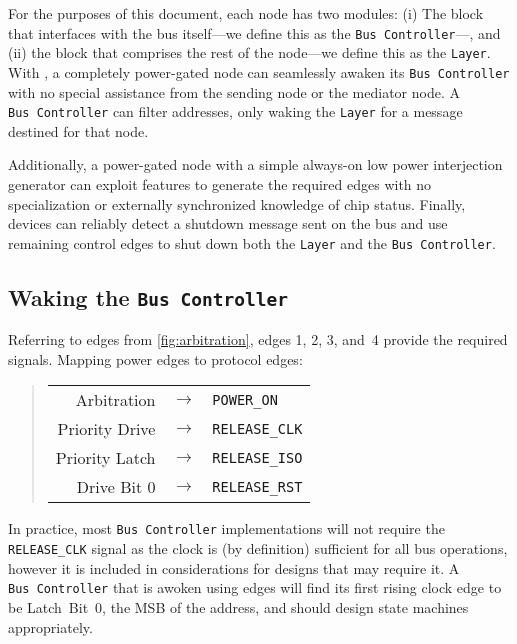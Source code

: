 For the purposes of this document, each \bus node has two modules: (i) The
block that interfaces with the bus itself---we define this as the {\tt Bus
Controller}---, and (ii) the block that comprises the rest of the node---we
define this as the {\tt Layer}. With \bus, a completely power-gated node can
seamlessly awaken its {\tt Bus~Controller} with no special assistance from the
sending node or the mediator node. A {\tt Bus~Controller} can filter addresses,
only waking the {\tt Layer} for a message destined for that node.

Additionally, a power-gated node with a simple always-on low power
interjection generator can exploit \bus features to generate the required
edges with no specialization or externally synchronized knowledge of chip
status. Finally, devices can reliably detect a shutdown message sent on the
bus and use remaining control edges to shut down both the {\tt Layer} and the
{\tt Bus~Controller}.

\subsection{Waking the \texttt{Bus~Controller}}
\label{sec:power-bus-controller-wakeup}
Referring to edges from \cref{fig:arbitration}, edges 1, 2, 3, and~4
provide the required signals. Mapping power edges to \bus protocol edges:

\begin{quote}
\begin{tabular}{r c l}
  Arbitration    & $\rightarrow$ & {\tt POWER\_ON} \\
  Priority Drive & $\rightarrow$ & {\tt RELEASE\_CLK} \\
  Priority Latch & $\rightarrow$ & {\tt RELEASE\_ISO} \\
  Drive Bit 0    & $\rightarrow$ & {\tt RELEASE\_RST} \\
\end{tabular}
\end{quote}

\noindent
In practice, most {\tt Bus~Controller} implementations will not require the
{\tt RELEASE\_CLK} signal as the \bus clock is (by definition) sufficient for
all bus operations, however it is included in considerations for designs that
may require it. A {\tt Bus~Controller} that is awoken using \bus edges will
find its first rising clock edge to be Latch~Bit~0, the MSB of the address,
and should design state machines appropriately.

